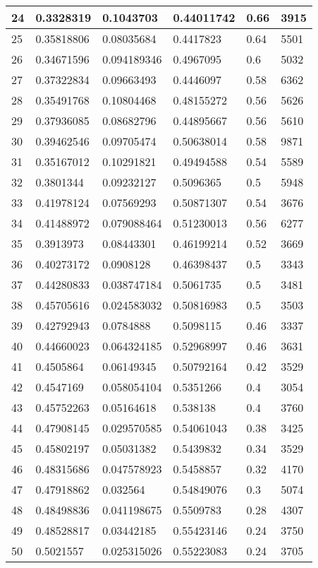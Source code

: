 \begin{longtable}{|l|l|l|l|l|l|}
24 & 0.3328319 & 0.1043703 & 0.44011742 & 0.66 & 3915 \\ \hline 
25 & 0.35818806 & 0.08035684 & 0.4417823 & 0.64 & 5501 \\ \hline 
26 & 0.34671596 & 0.094189346 & 0.4967095 & 0.6 & 5032 \\ \hline 
27 & 0.37322834 & 0.09663493 & 0.4446097 & 0.58 & 6362 \\ \hline 
28 & 0.35491768 & 0.10804468 & 0.48155272 & 0.56 & 5626 \\ \hline 
29 & 0.37936085 & 0.08682796 & 0.44895667 & 0.56 & 5610 \\ \hline 
30 & 0.39462546 & 0.09705474 & 0.50638014 & 0.58 & 9871 \\ \hline 
31 & 0.35167012 & 0.10291821 & 0.49494588 & 0.54 & 5589 \\ \hline 
32 & 0.3801344 & 0.09232127 & 0.5096365 & 0.5 & 5948 \\ \hline 
33 & 0.41978124 & 0.07569293 & 0.50871307 & 0.54 & 3676 \\ \hline 
34 & 0.41488972 & 0.079088464 & 0.51230013 & 0.56 & 6277 \\ \hline 
35 & 0.3913973 & 0.08443301 & 0.46199214 & 0.52 & 3669 \\ \hline 
36 & 0.40273172 & 0.0908128 & 0.46398437 & 0.5 & 3343 \\ \hline 
37 & 0.44280833 & 0.038747184 & 0.5061735 & 0.5 & 3481 \\ \hline 
38 & 0.45705616 & 0.024583032 & 0.50816983 & 0.5 & 3503 \\ \hline 
39 & 0.42792943 & 0.0784888 & 0.5098115 & 0.46 & 3337 \\ \hline 
40 & 0.44660023 & 0.064324185 & 0.52968997 & 0.46 & 3631 \\ \hline 
41 & 0.4505864 & 0.06149345 & 0.50792164 & 0.42 & 3529 \\ \hline 
42 & 0.4547169 & 0.058054104 & 0.5351266 & 0.4 & 3054 \\ \hline 
43 & 0.45752263 & 0.05164618 & 0.538138 & 0.4 & 3760 \\ \hline 
44 & 0.47908145 & 0.029570585 & 0.54061043 & 0.38 & 3425 \\ \hline 
45 & 0.45802197 & 0.05031382 & 0.5439832 & 0.34 & 3529 \\ \hline 
46 & 0.48315686 & 0.047578923 & 0.5458857 & 0.32 & 4170 \\ \hline 
47 & 0.47918862 & 0.032564 & 0.54849076 & 0.3 & 5074 \\ \hline 
48 & 0.48498836 & 0.041198675 & 0.5509783 & 0.28 & 4307 \\ \hline 
49 & 0.48528817 & 0.03442185 & 0.55423146 & 0.24 & 3750 \\ \hline 
50 & 0.5021557 & 0.025315026 & 0.55223083 & 0.24 & 3705 \\ \hline 
\end{longtable}